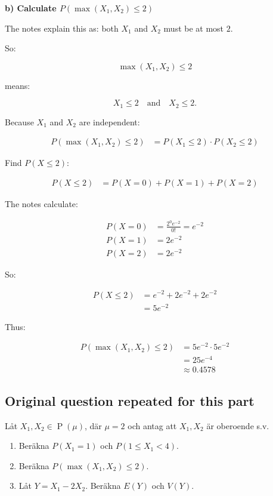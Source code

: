 \documentclass[10pt]{article}
\begin{document}
\textbf{b) Calculate $P(\max(X_1,X_2)\leq 2)$}

The notes explain this as:
both $X_1$ and $X_2$ must be at most $2$.

So:

\[
\max(X_1,X_2)\leq 2
\]

means:

\[
X_1\leq 2
\quad \text{and}\quad
X_2\leq 2.
\]

Because $X_1$ and $X_2$ are independent:

\begin{align*}
P(\max(X_1,X_2)\leq 2)
&=
P(X_1\leq 2)\cdot P(X_2\leq 2)
\end{align*}

Find $P(X\leq 2)$:

\begin{align*}
P(X\leq 2)
&=
P(X=0)+P(X=1)+P(X=2)
\end{align*}

The notes calculate:

\begin{align*}
P(X=0)
&=
\frac{2^0e^{-2}}{0!}
=e^{-2} \\[2mm]
P(X=1)
&=
2e^{-2} \\[2mm]
P(X=2)
&=
2e^{-2}
\end{align*}

So:

\begin{align*}
P(X\leq 2)
&=
e^{-2}+2e^{-2}+2e^{-2} \\[2mm]
&=
5e^{-2}
\end{align*}

Thus:

\begin{align*}
P(\max(X_1,X_2)\leq 2)
&=
5e^{-2}\cdot 5e^{-2} \\[2mm]
&=
25e^{-4} \\[2mm]
&\approx 0.4578
\end{align*}

\subsection*{Original question repeated for this part}
Låt $X_1,X_2\in \operatorname{P}(\mu)$, där $\mu=2$ och antag att
$X_1,X_2$ är oberoende s.v.

\begin{enumerate}[label=\alph*)]
\item
Beräkna $P(X_1=1)$ och $P(1\leq X_1<4)$.

\item
Beräkna $P(\max(X_1,X_2)\leq 2)$.

\item
Låt $Y=X_1-2X_2$. Beräkna $E(Y)$ och $V(Y)$.
\end{enumerate}
\end{document}
